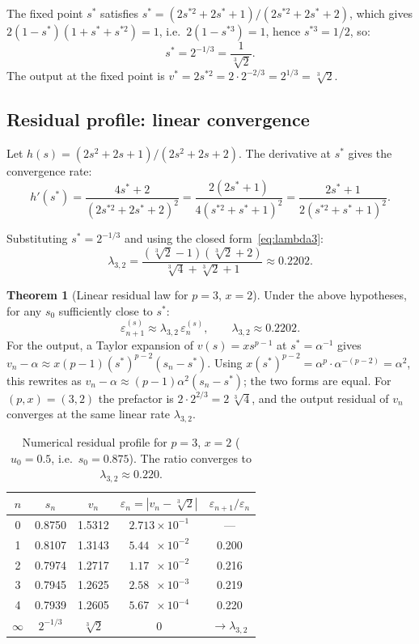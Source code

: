 \documentclass[11pt,a4paper]{article}
\theoremstyle{definition}
\newtheorem{theorem}{Theorem}[section]
\newcommand{\cbrt}[1]{\sqrt[3]{#1}}
\newcommand{\eps}{\varepsilon}
\begin{document}
The fixed point $s^*$ satisfies $s^* = (2s^{*2} + 2s^* + 1)/(2s^{*2} + 2s^* + 2)$, which gives $2(1-s^*)(1+s^*+s^{*2}) = 1$, i.e.\ $2(1-s^{*3}) = 1$, hence $s^{*3} = 1/2$, so:
\[
  s^* = 2^{-1/3} = \frac{1}{\cbrt{2}}.
\]
The output at the fixed point is $v^* = 2s^{*2} = 2 \cdot 2^{-2/3} = 2^{1/3} = \cbrt{2}$. \checkmark

\subsection{Residual profile: linear convergence}

Let $h(s) = (2s^2 + 2s + 1)/(2s^2 + 2s + 2)$. The derivative at $s^*$ gives the convergence rate:
\[
  h'(s^*) = \frac{4s^* + 2}{(2s^{*2} + 2s^* + 2)^2} = \frac{2(2s^*+1)}{4(s^{*2}+s^*+1)^2} = \frac{2s^*+1}{2(s^{*2}+s^*+1)^2}.
\]

Substituting $s^* = 2^{-1/3}$ and using the closed form~\eqref{eq:lambda3}:
\[
  \lambda_{3,2} = \frac{(\cbrt{2}-1)(\cbrt{2}+2)}{\cbrt{4}+\cbrt{2}+1} \approx 0.2202.
\]

\begin{theorem}[Linear residual law for $p=3$, $x=2$]
Under the above hypotheses, for any $s_0$ sufficiently close to $s^*$:
\[
  \eps_{n+1}^{(s)} \approx \lambda_{3,2}\,\eps_n^{(s)}, \qquad \lambda_{3,2} \approx 0.2202.
\]
For the output, a Taylor expansion of $v(s) = x s^{p-1}$ at $s^* = \alpha^{-1}$ gives $v_n - \alpha \approx x(p-1)(s^*)^{p-2}(s_n - s^*)$. Using $x(s^*)^{p-2} = \alpha^p \cdot \alpha^{-(p-2)} = \alpha^2$, this rewrites as $v_n - \alpha \approx (p-1)\alpha^2 (s_n - s^*)$; the two forms are equal. For $(p,x) = (3,2)$ the prefactor is $2 \cdot 2^{2/3} = 2\,\cbrt{4}$, and the output residual of $v_n$ converges at the same linear rate $\lambda_{3,2}$.
\end{theorem}

\begin{table}[h]
\centering
\begin{tabular}{ccccc}
\toprule
$n$ & $s_n$ & $v_n$ & $\eps_n = |v_n - \cbrt{2}|$ & $\eps_{n+1}/\eps_n$ \\
\midrule
0 & 0.8750 & 1.5312 & $2.713 \times 10^{-1}$ & --- \\
1 & 0.8107 & 1.3143 & $5.44\phantom{0} \times 10^{-2}$ & 0.200 \\
2 & 0.7974 & 1.2717 & $1.17\phantom{0} \times 10^{-2}$ & 0.216 \\
3 & 0.7945 & 1.2625 & $2.58\phantom{0} \times 10^{-3}$ & 0.219 \\
4 & 0.7939 & 1.2605 & $5.67\phantom{0} \times 10^{-4}$ & 0.220 \\
$\infty$ & $2^{-1/3}$ & $\cbrt{2}$ & $0$ & $\to \lambda_{3,2}$ \\
\bottomrule
\end{tabular}
\caption{Numerical residual profile for $p=3$, $x=2$ ($u_0 = 0.5$, i.e.\ $s_0 = 0.875$). The ratio converges to $\lambda_{3,2} \approx 0.220$.}
\end{table}
\end{document}
